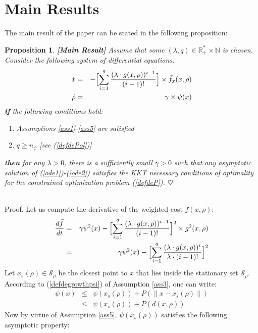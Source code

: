 \documentclass{article}
\newtheorem{proposition}{\bf Proposition}
\begin{document}
\section{Main Results} \label{secmainresult}
The main result of the paper can be stated in the following proposition:\\
\begin{proposition}{\bf [Main Result]} \label{prop1} 
Assume that some $(\lambda,q)\in \mathbb{R}_+^*\times \mathbb{N}$ is chosen. Consider the following system of differential equations:
\begin{eqnarray}
\dot x&=&-\Bigl[\sum_{i=1}^{q}\dfrac{(\lambda\cdot g(x,\rho))^{i-1}}{(i-1)!}\Bigr]\times \bar f_x(x,\rho) \label{ode1}\\
\dot \rho &=& \gamma\times \psi(x) \label{ode2} 
\end{eqnarray} 
{\bf if} the following conditions hold:
\begin{enumerate}
\item Assumptions \ref{ass1}-\ref{ass5} are satisfied
\item $q\ge n_\psi$ [see (\ref{defdePol})]
\end{enumerate}
{\bf then} for any $\lambda>0$, there is a sufficiently small $\gamma>0$ such that any asymptotic solution of (\ref{ode1})-(\ref{ode2}) satisfies the KKT necessary conditions of optimality for the constrained optimization problem (\ref{defdeP}). $\hfill \heartsuit$
\end{proposition}
\ \\
{\sc Proof}. Let us compute the derivative of the weighted cost $\bar f(x,\rho)$:
\begin{eqnarray}
\dfrac{d\bar f}{dt}&=&\gamma\psi^2(x)-\Bigl[\sum_{i=1}^{q}\dfrac{(\lambda\cdot g(x,\rho))^{i-1}}{(i-1)!}\Bigr]^2\times g^2(x,\rho) \nonumber \\
&=&\gamma\psi^2(x)-\Bigl[\sum_{i=1}^{q}\dfrac{(\lambda\cdot g(x,\rho))^{i}}{\lambda\cdot (i-1)!}\Bigr]^2 \label{iju8} 
\end{eqnarray} 
Let $x_s(\rho)\in \mathcal S_\rho$ be the closest point to $x$ that lies inside the stationary set $\mathcal S_\rho$. According to (\ref{defdegrowthpsi}) of Assumption \ref{ass3}, one can write:
\begin{eqnarray}
\psi(x)&\le& \psi(x_s(\rho))+P(\|x-x_s(\rho)\|)\\
&\le& \psi(x_s(\rho))+P(d(x,\rho)) \label{tfr5} 
\end{eqnarray}  
Now by virtue of Assumption \ref{ass5}, $\psi(x_s(\rho))$ satisfies the following asymptotic property:
\end{document}
